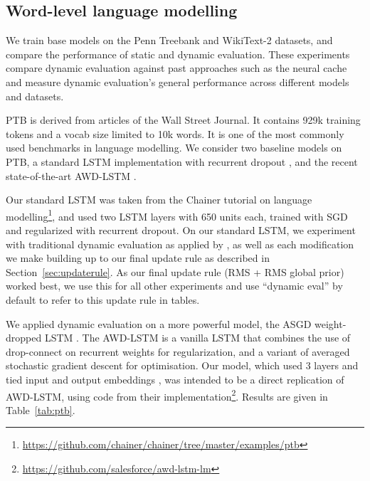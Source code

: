 \documentclass{article} \usepackage{iclr2018_conference,times}
\begin{document}
\subsection{Word-level language modelling}
\label{sec:ptb}
We train base models on the Penn Treebank \citep[PTB,][]{marcus1993} and WikiText-2 \citep{Merity2016} datasets, and compare the performance of static and dynamic evaluation. These experiments compare dynamic evaluation against past approaches such as the neural cache and measure dynamic evaluation's general performance across different models and datasets. 

PTB is derived from articles of the Wall Street Journal. It contains 929k training tokens and a vocab size limited to 10k words. It is one of the most commonly used benchmarks in language modelling. We consider two baseline models on PTB, a standard LSTM implementation with recurrent dropout \citep{Zaremba-2014}, and the recent state-of-the-art AWD-LSTM \citep{merity2017}. 

Our standard LSTM was taken from the Chainer tutorial on language modelling\footnote{\url{https://github.com/chainer/chainer/tree/master/examples/ptb}}, and used two LSTM layers with 650 units each, trained with SGD and regularized with recurrent dropout. On our standard LSTM, we experiment with traditional dynamic evaluation as applied by \citet{mikolov2010}, as well as each modification we make building up to our final update rule as described in Section~\ref{sec:updaterule}. As our final update rule (RMS + RMS global prior) worked best, we use this for all other experiments and use ``dynamic eval'' by default to refer to this update rule in tables. 

We applied dynamic evaluation on a more powerful model, the ASGD weight-dropped LSTM \citep[AWD-LSTM,][]{merity2017}. The AWD-LSTM is a vanilla LSTM that combines the use of drop-connect \citep{wan2013} on recurrent weights for regularization, and a variant of averaged stochastic gradient descent \citep{polyak1992} for optimisation. Our model, which used 3 layers and tied input and output embeddings \citep{press2017,inan2017}, was intended to be a direct replication of AWD-LSTM, using code from their implementation\footnote{\url{https://github.com/salesforce/awd-lstm-lm}}. Results are given in Table~\ref{tab:ptb}.
\end{document}

